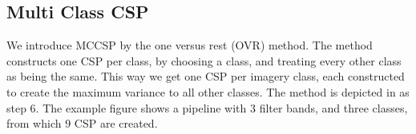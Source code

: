 \subsection{Multi Class CSP}
We introduce MCCSP by the one versus rest (OVR) method. The method constructs one CSP per class, by choosing a class, and treating every other class as being the same. This way we get one CSP per imagery class, each constructed to create the maximum variance to all other classes. The method is depicted in  as step 6. The example figure shows a pipeline with 3 filter bands, and three classes, from which 9 CSP are created.








